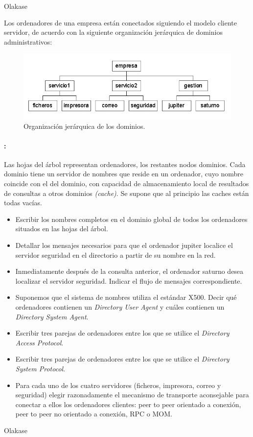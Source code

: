 \begin{problem}
  Olakase

  \end{problem}
  
  \begin{problem}
  Los ordenadores de una empresa están conectados siguiendo el modelo cliente
servidor, de acuerdo con la siguiente organización jerárquica de dominios
administrativos: 
\begin{figure}[hbt]
\centering
\includegraphics{img/si2-t4-ej-dom2.png}
\caption{Organización jerárquica de los dominios.}
\end{figure}
  \paragraph{:} Las hojas del árbol representan ordenadores, los restantes nodos 
dominios. Cada dominio tiene un servidor de nombres que reside en un 
ordenador, cuyo nombre coincide con el del dominio, con capacidad de 
almacenamiento local de resultados de consultas a otros dominios \textit{(cache)}. Se supone que al principio las caches están todas vacías.
  \begin{itemize}
    \item Escribir los nombres completos en el dominio global de todos los ordenadores
    situados en las hojas del árbol.
    \item Detallar los mensajes necesarios para que el ordenador jupiter localice
    el servidor seguridad en el directorio a partir de su nombre en la red.
    \item Inmediatamente después de la consulta anterior, el 
ordenador saturno desea localizar el servidor seguridad. Indicar el 
flujo de mensajes correspondiente.
    \item Suponemos que el sistema de nombres utiliza el estándar X500. Decir qué ordenadores contienen un \textit{Directory User Agent} y cuáles contienen un \textit{Directory System Agent}.
    \item Escribir tres parejas de ordenadores entre los que se utilice el \textit{Directory Access Protocol}.
    \item Escribir tres parejas de ordenadores entre los que se utilice el \textit{Directory System Protocol}.
    \item Para cada uno de los cuatro servidores (ficheros, 
impresora, correo y seguridad) elegir razonadamente el mecanismo de 
transporte aconsejable para conectar a ellos los ordenadores clientes: 
peer to peer orientado a conexión, peer to peer no orientado a conexión,
 RPC o MOM.
  \end{itemize}
\solution
Olakase

\end{problem}